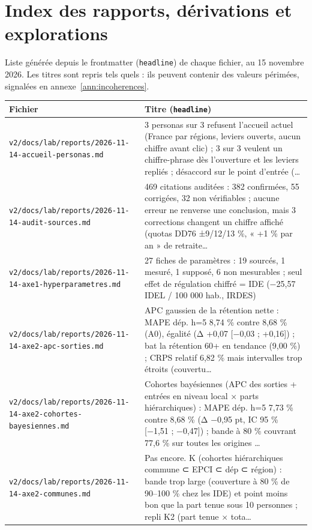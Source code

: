 \section{Index des rapports, dérivations et explorations}\label{ann:index}
Liste générée depuis le frontmatter (\texttt{headline}) de chaque fichier, au 15 novembre 2026. Les titres sont repris tels quels : ils peuvent contenir des valeurs périmées, signalées en annexe~\ref{ann:incoherences}.
\begin{small}\begin{longtable}{@{}p{}p{}@{}}
\toprule Fichier & Titre (\texttt{headline}) \\ \midrule\endhead
\texttt{v2/docs/lab/reports/2026-11-14-accueil-personas.md} & 3 personas sur 3 refusent l'accueil actuel (France par régions, leviers ouverts, aucun chiffre avant clic) ; 3 sur 3 veulent un chiffre-phrase dès l'ouverture et les leviers repliés ; désaccord sur le point d'entrée (… \\
\texttt{v2/docs/lab/reports/2026-11-14-audit-sources.md} & 469 citations auditées : 382 confirmées, 55 corrigées, 32 non vérifiables ; aucune erreur ne renverse une conclusion, mais 3 corrections changent un chiffre affiché (quotas DD76 ±9/12/13 \%, « +1 \% par an » de retraite… \\
\texttt{v2/docs/lab/reports/2026-11-14-axe1-hyperparametres.md} & 27 fiches de paramètres : 19 sourcés, 1 mesuré, 1 supposé, 6 non mesurables ; seul effet de régulation chiffré = IDE (−25,57 IDEL / 100 000 hab., IRDES) \\
\texttt{v2/docs/lab/reports/2026-11-14-axe2-apc-sorties.md} & APC gaussien de la rétention nette : MAPE dép. h=5 8,74 \% contre 8,68 \% (A0), égalité (Δ +0,07 [−0,03 ; +0,16]) ; bat la rétention 60+ en tendance (9,00 \%) ; CRPS relatif 6,82 \% mais intervalles trop étroits (couvertu… \\
\texttt{v2/docs/lab/reports/2026-11-14-axe2-cohortes-bayesiennes.md} & Cohortes bayésiennes (APC des sorties + entrées en niveau local × parts hiérarchiques) : MAPE dép. h=5 7,73 \% contre 8,68 \% (Δ −0,95 pt, IC 95 \% [−1,51 ; −0,47]) ; bande à 80 \% couvrant 77,6 \% sur toutes les origines … \\
\texttt{v2/docs/lab/reports/2026-11-14-axe2-communes.md} & Pas encore. K (cohortes hiérarchiques commune ⊂ EPCI ⊂ dép ⊂ région) : bande trop large (couverture à 80 \% de 90–100 \% chez les IDE) et point moins bon que la part tenue sous 10 personnes ; repli K2 (part tenue × tota… \\

\end{longtable}
\end{small}
